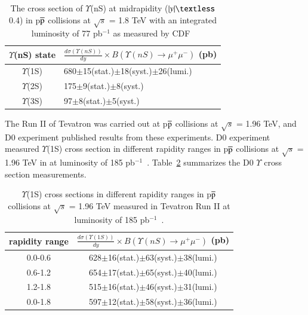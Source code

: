 \begin{table}
  \begin{center}
    \caption[]{The cross section of $\Upsilon$(nS) at midrapidity
($|y|\textless$ 0.4) in p$\overline{\rm p}$ collisions at $\surd s$ = 1.8 TeV with
an integrated luminosity of 77 pb$^{-1}$ as measured by CDF~\cite{CDF:2001fdy}}
\label{Tab:YCrossCDF02}
\begin{tabular}{cl} 
\hline 
\hline
$\Upsilon$(nS) state             &$\frac{d\sigma(\Upsilon(nS))}{dy}\times B(\Upsilon(nS)\rightarrow\mu^{+}\mu^{-})$ (pb)    \\              
\hline
$\Upsilon$(1S)                   &680$\pm$15(stat.)$\pm$18(syst.)$\pm$26(lumi.)\\
$\Upsilon$(2S)                   &175$\pm$9(stat.)$\pm$8(syst.)\\
$\Upsilon$(3S)                   &97$\pm$8(stat.)$\pm$5(syst.)\\   
\hline
\hline
\end{tabular}
\end{center}
\end{table}

The Run II of Tevatron was carried out at p$\overline{\rm p}$ collisions at
$\surd s$ = 1.96 TeV, and D0 experiment published results from these
experiments.
D0 experiment measured $\Upsilon$(1S) cross section in different 
rapidity ranges in p$\overline{\rm p}$ collisions at $\surd s$  = 1.96 TeV in
at luminosity of 185 pb$^{-1}$~\cite{D0:2005klj}.
Table~\ref{Tab:YCrossD0RunII} summarizes the D0 $\Upsilon$ cross section
measurements.


\begin{table}
 \begin{center}
   \caption[]{ $\Upsilon$(1S) cross sections in different rapidity ranges in p$\overline{\rm p}$
    collisions at $\surd s$ = 1.96 TeV measured in 
    Tevatron Run II at luminosity of 185 pb$^{-1}$~\cite{D0:2005klj}. }
\label{Tab:YCrossD0RunII}
\begin{tabular}{cc} 
\hline 
\hline
rapidity range             &$\frac{d\sigma(\Upsilon(1S))}{dy}\times B(\Upsilon(nS)\rightarrow\mu^{+}\mu^{-})$ (pb)    \\              
\hline
0.0-0.6                   &628$\pm$16(stat.)$\pm$63(syst.)$\pm$38(lumi.)\\
0.6-1.2                   &654$\pm$17(stat.)$\pm$65(syst.)$\pm$40(lumi.)\\
1.2-1.8                   &515$\pm$16(stat.)$\pm$46(syst.)$\pm$31(lumi.)\\
0.0-1.8                   &597$\pm$12(stat.)$\pm$58(syst.)$\pm$36(lumi.)\\
\hline
\hline
\end{tabular}
\end{center}
\end{table}

